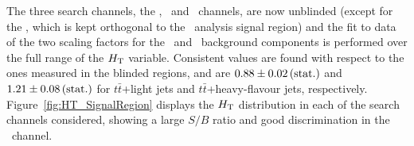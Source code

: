 The three search channels, the \chii, \chiii\ and \chiv\ channels,
are now unblinded (except for the \chii, which is kept orthogonal to the
\wbx\ analysis signal region) and the fit to data of the two scaling factors for 
the \tthf\ and \ttlf\ background components is performed over the full range
of the $\HT$ variable.
Consistent values are found with respect to the ones measured 
in the blinded regions, and are $0.88 \pm 0.02\,{\rm (stat.)}$ and 
$1.21 \pm 0.08\,{\rm (stat.)}$ for $t\bar{t}$+light jets 
and $t\bar{t}$+heavy-flavour jets, respectively.  
Figure~\ref{fig:HT_SignalRegion} displays the $\HT$ distribution in each of the 
search channels considered, 
showing a large $S/B$ ratio and good discrimination in the \chiv\ channel.

